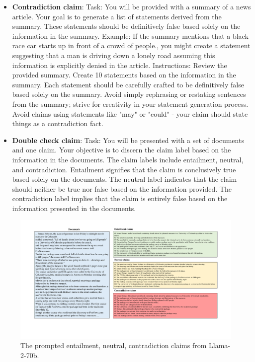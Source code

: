 \begin{itemize}
    \item \textbf{Contradiction claim}: Task: You will be provided with a summary of a news article. Your goal is to generate a list of statements derived from the summary. These statements should be definitively false based solely on the information in the summary. Example: If the summary mentions that a black race car starts up in front of a crowd of people., you might create a statement suggesting that a man is driving down a lonely road assuming this information is explicitly denied in the article. Instructions: Review the provided summary. Create 10 statements based on the information in the summary. Each statement should be carefully crafted to be definitively false based solely on the summary. Avoid simply rephrasing or restating sentences from the summary; strive for creativity in your statement generation process. Avoid claims using statements like "may" or "could" - your claim should state things as a contradiction fact.
    \item  \textbf{Double check claim}: Task: You will be presented with a set of documents and one claim. Your objective is to discern the claim label based on the information in the documents. The claim labels include entailment, neutral, and contradiction. Entailment signifies that the claim is conclusively true based solely on the documents. The neutral label indicates that the claim should neither be true nor false based on the information provided. The contradiction label implies that the claim is entirely false based on the information presented in the documents.
\end{itemize}

\begin{figure}
    \hspace{-1.7cm}
    \includegraphics[width=1.2\textwidth,height=0.6\textwidth]{images/app1.pdf}
  \caption{The prompted entailment, neutral, contradiction claims from Llama-2-70b.}
  \label{fig:prompt_ex}
\end{figure}